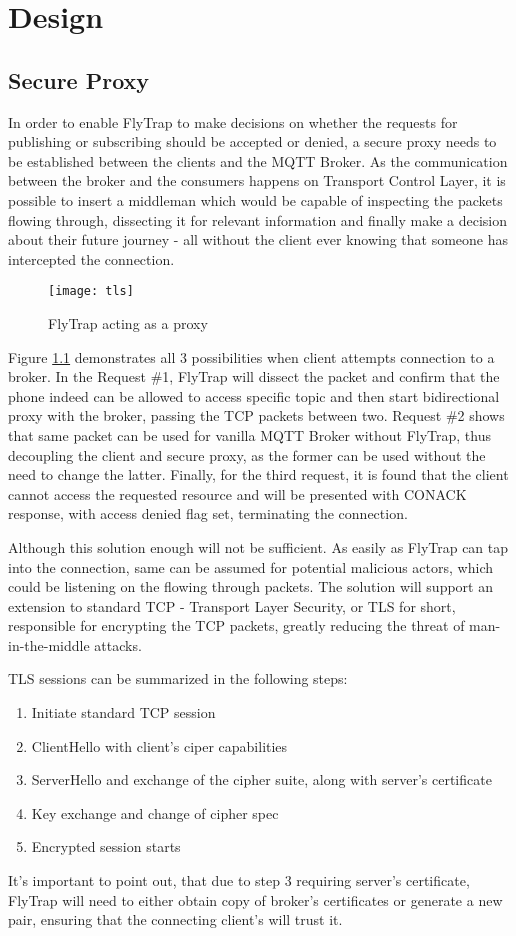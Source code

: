 \chapter{Design\label{chap:design}}

\section{Secure Proxy}
In order to enable FlyTrap to make decisions on whether the requests for publishing or subscribing should be accepted or denied, a secure proxy needs to be established between the clients and the MQTT Broker. As the communication between the broker and the consumers happens on Transport Control Layer, it is possible to insert a middleman which would be capable of inspecting the packets flowing through, dissecting it for relevant information and finally make a decision about their future journey - all  without the client ever knowing that someone has intercepted the connection. 
\begin{figure}[h]
    \centering
    \texttt{[image: tls]}
    \caption{FlyTrap acting as a proxy}
    \label{fig:tls}
\end{figure}

Figure \ref{fig:tls} demonstrates all 3 possibilities when client attempts connection to a broker. In the Request \#1, FlyTrap will dissect the packet and confirm that the phone indeed can be allowed to access specific topic and then start bidirectional proxy with the broker, passing the TCP packets between two. Request \#2 shows that same packet can be used for vanilla MQTT Broker without FlyTrap, thus decoupling the client and secure proxy, as the former can be used without the need to change the latter. Finally, for the third request, it is found that the client cannot access the requested resource and will be presented with CONACK response, with access denied flag set, terminating the connection.

Although this solution enough will not be sufficient. As easily as FlyTrap can tap into the connection, same can be assumed for potential malicious actors, which could be listening on the flowing through packets. The solution will support an extension to standard TCP - Transport Layer Security, or TLS for short, responsible for encrypting the TCP packets, greatly reducing the threat of man-in-the-middle attacks.

TLS sessions can be summarized in the following steps:
\begin{enumerate}
\item Initiate standard TCP session
\item ClientHello with client's ciper capabilities 
\item ServerHello and exchange of the cipher suite, along with server's certificate
\item Key exchange and change of cipher spec
\item Encrypted session starts
\end{enumerate}

It's important to point out, that due to step 3 requiring server's certificate, FlyTrap will need to either obtain copy of broker's certificates or generate a new pair, ensuring that the connecting client's will trust it.



